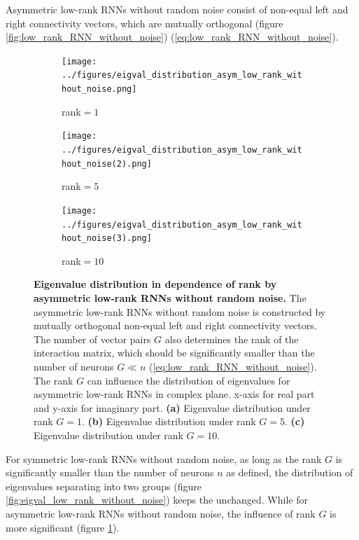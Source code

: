 \documentclass[11pt]{article}
\begin{document}
	Asymmetric low-rank RNNs without random noise consist of non-equal left and right connectivity vectors, which are mutually orthogonal (figure \ref{fig:low_rank_RNN_without_noise}) (\ref{eq:low_rank_RNN_without_noise}). 
		\begin{figure}[H]
			\centering
			\begin{subfigure}[b]{0.3\textwidth}
				\centering
				\texttt{[image: ../figures/eigval\_distribution\_asym\_low\_rank\_without\_noise.png]}
				\caption{rank$=1$}
			\end{subfigure}
			\begin{subfigure}[b]{0.3\textwidth}
				\centering
				\texttt{[image: ../figures/eigval\_distribution\_asym\_low\_rank\_without\_noise(2).png]}
				\caption{rank$=5$}
			\end{subfigure}
			\begin{subfigure}[b]{0.3\textwidth}
				\centering
				\texttt{[image: ../figures/eigval\_distribution\_asym\_low\_rank\_without\_noise(3).png]}
				\caption{rank$=10$}
			\end{subfigure}
			\caption{\textbf{Eigenvalue distribution in dependence of rank by asymmetric low-rank RNNs without random noise.} The asymmetric low-rank RNNs without random noise is constructed by mutually orthogonal non-equal left and right connectivity vectors. The number of vector pairs $G$ also determines the rank of the interaction matrix, which should be significantly smaller than the number of neurons $G \ll n$ (\ref{eq:low_rank_RNN_without_noise}). The rank $G$ can influence the distribution of eigenvalues for asymmetric low-rank RNNs in complex plane. x-axis for real part and y-axis for imaginary part. \textbf{(a)} Eigenvalue distribution under rank $G=1$. \textbf{(b)} Eigenvalue distribution under rank $G=5$. \textbf{(c)} Eigenvalue distribution under rank $G=10$. }
			\label{fig:eigval_distribution_asym_low_rank_without_noise}
		\end{figure}
	
	For symmetric low-rank RNNs without random noise, as long as the rank $G$ is significantly smaller than the number of neurons $n$ as defined, the distribution of eigenvalues separating into two groups (figure \ref{fig:eigval_low_rank_without_noise}) keeps the unchanged. While for asymmetric low-rank RNNs without random noise, the influence of rank $G$ is more significant (figure \ref{fig:eigval_distribution_asym_low_rank_without_noise}). 
	
\end{document}
